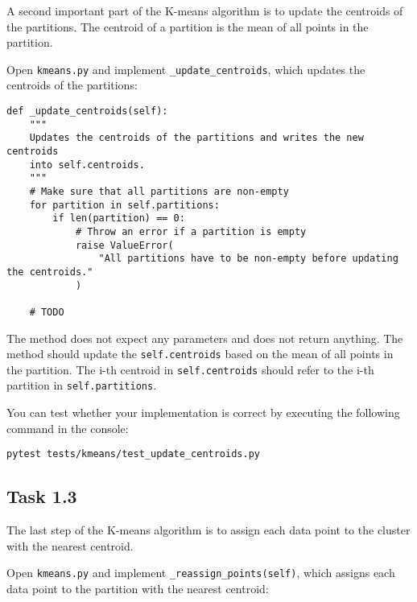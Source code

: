 \documentclass[
english,
smallborders
]{i6prcsht}
\begin{document}
A second important part of the K-means algorithm is to update the centroids of the partitions. The centroid of a partition is the mean of all points in the partition.

Open \texttt{kmeans.py} and implement \texttt{\_update\_centroids}, which updates the centroids of the partitions:

\vspace*{0.3cm}

\newpage

\begin{lstlisting}
def _update_centroids(self):
	"""
	Updates the centroids of the partitions and writes the new centroids
	into self.centroids.
	"""
	# Make sure that all partitions are non-empty
	for partition in self.partitions:
		if len(partition) == 0:
			# Throw an error if a partition is empty
			raise ValueError(
				"All partitions have to be non-empty before updating the centroids."
			)

	# TODO	
\end{lstlisting}

\vspace*{0.1cm}

The method does not expect any parameters and does not return anything. The method should update the \texttt{self.centroids} based on the mean of all points in the partition. The i-th centroid in \texttt{self.centroids} should refer to the i-th partition in \texttt{self.partitions}.

You can test whether your implementation is correct by executing the following command in
the console:

\vspace*{0.3cm}

\begin{lstlisting}
pytest tests/kmeans/test_update_centroids.py
\end{lstlisting}

\vspace*{0.1cm}

\subsection*{Task 1.3}

The last step of the K-means algorithm is to assign each data point to the cluster with the nearest centroid. 

Open \texttt{kmeans.py} and implement \texttt{\_reassign\_points(self)}, which assigns each data point to the partition with the nearest centroid:
\end{document}
